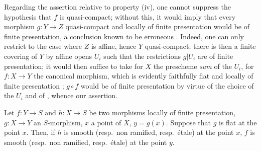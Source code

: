 \begin{remark}[17.7.6]
\label{IV.17.7.6}
Regarding the assertion relative to property (iv), one cannot suppress the hypothesis that $f$ is quasi-compact; without this, it would imply that every morphism $g:Y\to Z$ quasi-compact and locally of finite presentation would be of finite presentation, a conclusion known to be erroneous .
Indeed, one can only restrict to the case where $Z$ is affine, hence $Y$ quasi-compact; \mbox{there} is then a finite covering of $Y$ by affine opens $U_i$ such that the restrictions $g|U_i$ are of finite presentation; it would then suffice to take for $X$ the prescheme \emph{sum} of the $U_i$, for $f:X\to Y$ the canonical morphism, which is evidently faithfully flat and locally of finite presentation ; $g\circ f$ would be of finite presentation by virtue of the choice of the $U_i$ and of , whence our assertion.
\end{remark}

\begin{proposition}[17.7.7]
\label{IV.17.7.7}
Let $f:Y\to S$ and $h:X\to S$ be two morphisms locally of finite presentation, $g:X\to Y$ an $S$-morphism, $x$ a point of $X$, $y=g(x)$.
Suppose that $g$ is flat at the point $x$.
Then, if $h$ is smooth (resp.\ non ramified, resp.\ \'etale) at the point $x$, $f$ is smooth (resp.\ non ramified, resp.\ \'etale) at the point $y$.
\end{proposition}


